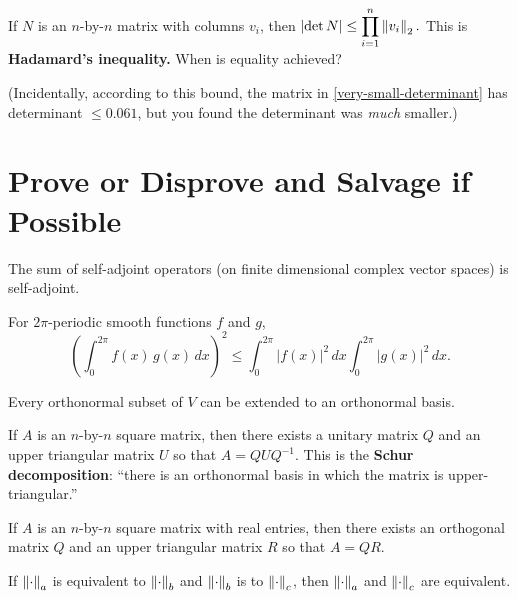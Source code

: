 \documentclass{homework}
\begin{document}
\begin{problem}\label{hadamard-inequality}If $N$ is an $n$-by-$n$ matrix with columns $v_i$, then
\( \displaystyle\left| \det  N  \right| \leq \prod_{i=1}^n \left\lVert v_i\right\rVert_2. \)
This is \textbf{Hadamard's inequality.}  When is equality achieved?

(Incidentally, according to this bound, the matrix in \ref{very-small-determinant} has determinant $\leq 0.061$, but you found the determinant was \textit{much} smaller.)
\end{problem}

\section{Prove or Disprove and Salvage if Possible}

\begin{problem}
  The sum of self-adjoint operators (on finite dimensional complex vector spaces) is self-adjoint.
\end{problem}

\begin{problem}\label{cauchy-schwarz-application}For $2\pi$-periodic smooth functions $f$ and $g$,
  \[
    \left( \int_{0}^{2\pi} f(x) \, g(x) \, dx  \right)^2 \leq
    \int_{0}^{2\pi} \left| f(x) \right|^2 \, dx
    \int_{0}^{2\pi} \left| g(x) \right|^2 \, dx.
  \]
\end{problem}

\begin{problem}
  Every orthonormal subset of $V$ can be extended to an orthonormal basis.
\end{problem}

\begin{problem}\label{schur-decomposition}If $A$ is an $n$-by-$n$ square matrix, then there exists a unitary matrix $Q$ and an upper triangular matrix $U$ so that $A = QUQ^{-1}$.  This is the \textbf{Schur decomposition}: ``there is an orthonormal basis in which the matrix is upper-triangular.''
\end{problem}%

\begin{problem}\label{qr-decomposition}If $A$ is an $n$-by-$n$ square matrix with real entries, then there exists an orthogonal matrix $Q$ and an upper triangular matrix $R$ so that $A = QR$.
\end{problem}

\begin{problem}\label{transitivity-of-equivalence-of-norms}If $\left\lVert\cdot\right\rVert_a$ is equivalent to $\left\lVert\cdot\right\rVert_b$ and $\left\lVert\cdot\right\rVert_b$ is to $\left\lVert\cdot\right\rVert_c$, then $\left\lVert\cdot\right\rVert_a$ and $\left\lVert\cdot\right\rVert_c$ are equivalent. %
\end{problem}
\end{document}
